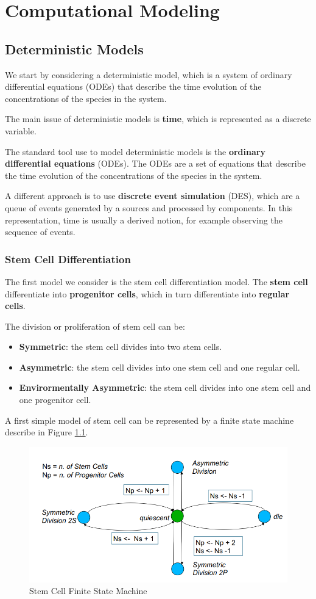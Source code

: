 \chapter{Computational Modeling}
\section{Deterministic Models}
We start by considering a deterministic model, which is a system of ordinary
differential equations (ODEs) that describe the time evolution of the
concentrations of the species in the system.

The main issue of deterministic models is \textbf{time}, which is represented
as a discrete variable.

The standard tool use to model deterministic models is the \textbf{ordinary
    differential equations} (ODEs). The ODEs are a set of equations that describe
the time evolution of the concentrations of the species in the system.

A different approach is to use \textbf{discrete event simulation} (DES), which
are a queue of events generated by a sources and processed by components. In this
representation, time is usually a derived notion, for example observing the
sequence of events.

\subsection{Stem Cell Differentiation}
The first model we consider is the stem cell differentiation model. The
\textbf{stem cell} differentiate into \textbf{progenitor cells}, which in turn
differentiate into \textbf{regular cells}.

The division or proliferation of stem cell can be:
\begin{itemize}
    \item \textbf{Symmetric}: the stem cell divides into two stem cells.
    \item \textbf{Asymmetric}: the stem cell divides into one stem cell and one regular cell.
    \item \textbf{Envirormentally Asymmetric}: the stem cell divides into one
          stem cell and one progenitor cell.
\end{itemize}

A first simple model of stem cell can be represented by a finite state machine
describe in Figure \ref{fig:stem_cell_fsm}.

\begin{figure}[!ht]
    \centering
    \includegraphics[width=.7\textwidth]{img/stemcellsFSA.png}
    \caption{Stem Cell Finite State Machine}
    \label{fig:stem_cell_fsm}
\end{figure}

